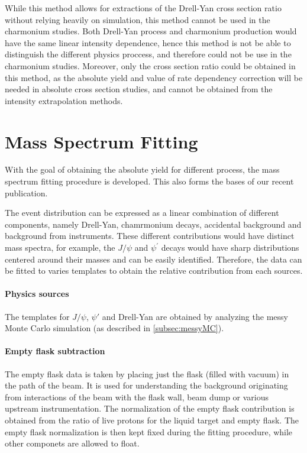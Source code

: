 \documentclass[../main.tex]{subfiles}
\begin{document}

While this method allows for extractions of the Drell-Yan cross section ratio without relying
heavily on simulation, this method cannot be used in the charmonium studies.
Both Drell-Yan process and charmonium production would have the same linear intensity dependence,
hence this method is not be able to distinguish the different physics proccess, and therefore could
not be use in the charmonium studies. Moreover, only the cross section ratio could be obtained in
this method, as the absolute yield and value of rate dependency correction will be needed in
absolute cross section studies, and cannot be obtained from the intensity extrapolation methods.

\section{Mass Spectrum Fitting}
With the goal of obtaining the absolute yield for different process, the mass spectrum fitting
procedure is developed. This also forms the bases of our recent publication\cite{dove2023}.

The event distribution can be expressed as a linear combination of different components,
namely Drell-Yan, chamrmonium decays, accidental background and background from instruments.
These different contributions would have distinct mass spectra, for example, the $J/\psi$
and $\psi^\prime$ decays would have sharp distributions centered around their masses and
can be easily identified. Therefore, the data can be fitted to varies templates to obtain
the relative contribution from each sources.

\paragraph{Physics sources}
The templates for $J/\psi$, $\psi'$ and Drell-Yan are obtained by analyzing the messy Monte Carlo
simulation (as described in \cref{subsec:messyMC}).

\paragraph{Empty flask subtraction}
The empty flask data is taken by placing just the flask (filled with vacuum) in the path of
the beam. It is used for understanding the background originating from interactions of the beam
with the flask wall, beam dump or various upstream instrumentation. The normalization of the
empty flask contribution is obtained from the ratio of live protons for the liquid target and
empty flask. The empty flask normalization is then kept fixed during the fitting procedure, while
other componets are allowed to float.
\end{document}
